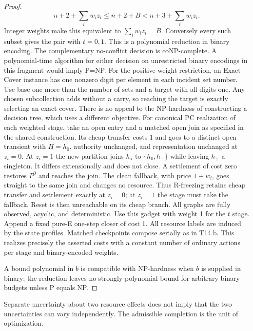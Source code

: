 \begin{proof}
\[
n+2+\sum_iw_i z_i \le n+2+B < n+3+\sum_iw_i z_i.
\]
Integer weights make this equivalent to \(\sum_iw_i z_i=B\). Conversely every such subset gives the pair with \(t=0,1\). This is a polynomial reduction in binary encoding. The complementary no-conflict decision is coNP-complete. A polynomial-time algorithm for either decision on unrestricted binary encodings in this fragment would imply P=NP. For the positive-weight restriction, an Exact Cover instance has one nonzero digit per element in each incident set number. Use base one more than the number of sets and a target with all digits one. Any chosen subcollection adds without a carry, so reaching the target is exactly selecting an exact cover. There is no appeal to the NP-hardness of constructing a decision tree, which uses a different objective.
For canonical PC realization of each weighted stage, take an open entry and a matched open join as specified in the shared construction. Its cheap transfer costs 1 and goes to a distinct open transient with \(H=h_0\), authority unchanged, and representation unchanged at \(z_i=0\). At \(z_i=1\) the new partition joins \(h_{\star}\) to \(\{h_0,h_-\}\) while leaving \(h_+\) a singleton. It differs extensionally and does not close. A settlement of cost zero restores \(P^0\) and reaches the join. The clean fallback, with price \(1+w_i\), goes straight to the same join and changes no resource. Thus R-freezing retains cheap transfer and settlement exactly at \(z_i=0\); at \(z_i=1\) the stage must take the fallback. Reset is then unreachable on its cheap branch. All graphs are fully observed, acyclic, and deterministic. Use this gadget with weight 1 for the \(t\) stage. Append a fixed pure-E one-step closer of cost 1. All resource labels are induced by the state profiles. Matched checkpoints compose serially as in T14.b. This realizes precisely the asserted costs with a constant number of ordinary actions per stage and binary-encoded weights.

A bound polynomial in \(b\) is compatible with NP-hardness when \(b\) is supplied in binary; the reduction leaves no strongly polynomial bound for arbitrary binary budgets unless P equals NP.

\end{proof}

Separate uncertainty about two resource effects does not imply that the two uncertainties can vary independently. The admissible completion is the unit of optimization.

